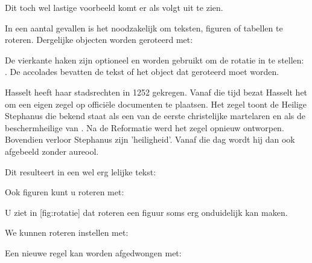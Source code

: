 \stopbuffer

\typebuffer

Dit toch wel lastige voorbeeld komt er als volgt uit te
zien.

\haalbuffer




In een aantal gevallen is het noodzakelijk om teksten,
figuren of tabellen te roteren. Dergelijke objecten worden
geroteerd met:


De vierkante haken zijn optioneel en worden gebruikt om de
rotatie in te stellen: . De accolades
bevatten de tekst of het object dat geroteerd moet worden.

\startbuffer
Hasselt heeft haar stadsrechten in 1252 gekregen. Vanaf die
tijd bezat Hasselt het 
om een eigen zegel op offici\"ele documenten te plaatsen. Het
zegel toont de Heilige Stephanus die bekend staat als een van
de eerste christelijke martelaren en als de beschermheilige
van . Na de Reformatie werd het
zegel opnieuw ontworpen. Bovendien verloor Stephanus zijn
'heiligheid'. Vanaf die dag wordt hij dan ook afgebeeld zonder
aureool.
\stopbuffer

\typebuffer

Dit resulteert in een wel erg lelijke tekst:

\haalbuffer

Ook figuren kunt u roteren met:

\startbuffer
{}
  \roteer[rotatie=180]
  {\externfiguur[ma-cb-15][breedte=10cm]}
\stopbuffer

\typebuffer

U ziet in [fig:rotatie] dat roteren een figuur
soms erg onduidelijk kan maken.

\haalbuffer

We kunnen roteren instellen met:





Een nieuwe regel kan worden afgedwongen met:


